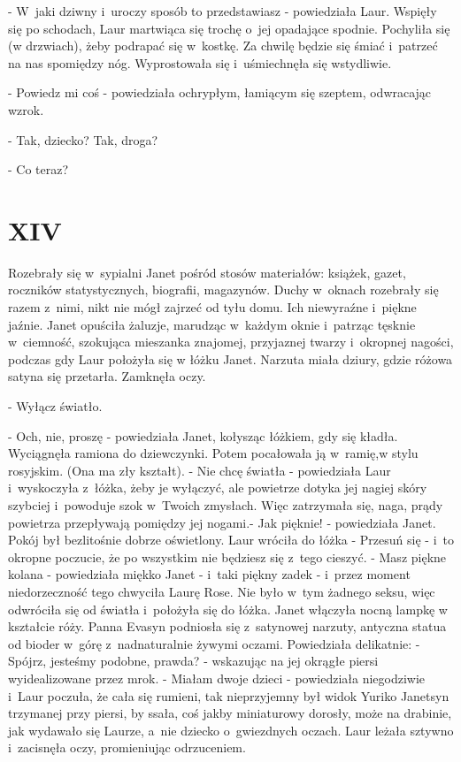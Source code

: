 \documentclass[oneside,polish,12pt,sfheadings]{mwbk}
\begin{document}
- W~jaki dziwny i~uroczy sposób to przedstawiasz - powiedziała Laur.
Wspięły się po schodach, Laur martwiąca się trochę o~jej opadające
spodnie. Pochyliła się (w drzwiach), żeby podrapać się w~kostkę. Za
chwilę będzie się śmiać i~patrzeć na nas spomiędzy nóg. Wyprostowała
się i~uśmiechnęła się wstydliwie.

- Powiedz mi coś - powiedziała ochrypłym, łamiącym się szeptem, odwracając
wzrok.

- Tak, dziecko? Tak, droga?

- Co teraz?

\chapter{XIV}

Rozebrały się w~sypialni Janet pośród stosów materiałów: książek,
gazet, roczników statystycznych, biografii, magazynów. Duchy w~oknach
rozebrały się razem z~nimi, nikt nie mógł zajrzeć od tyłu domu. Ich
niewyraźne i~piękne jaźnie. Janet opuściła żaluzje, marudząc w~każdym
oknie i~patrząc tęsknie w~ciemność, szokująca mieszanka znajomej,
przyjaznej twarzy i~okropnej nagości, podczas gdy Laur położyła się
w łóżku Janet. Narzuta miała dziury, gdzie różowa satyna się przetarła.
Zamknęła oczy.

- Wyłącz światło.

- Och, nie, proszę - powiedziała Janet, kołysząc łóżkiem, gdy się
kładła. Wyciągnęła ramiona do dziewczynki. Potem pocałowała ją w~ramię,w
stylu rosyjskim. (Ona ma zły kształt). - Nie chcę światła - powiedziała
Laur i~wyskoczyła z~łóżka, żeby je wyłączyć, ale powietrze dotyka
jej nagiej skóry szybciej i~powoduje szok w~Twoich zmysłach. Więc
zatrzymała się, naga, prądy powietrza przepływają pomiędzy jej nogami.- Jak pięknie! - powiedziała Janet. Pokój był bezlitośnie dobrze oświetlony.
Laur wróciła do łóżka - Przesuń się - i~to okropne poczucie, że po
wszystkim nie będziesz się z~tego cieszyć. - Masz piękne kolana -
powiedziała miękko Janet - i~taki piękny zadek - i~przez moment niedorzeczność
tego chwyciła Laurę Rose. Nie było w~tym żadnego seksu, więc odwróciła
się od światła i~położyła się do łóżka. Janet włączyła nocną lampkę
w kształcie róży. Panna Evasyn podniosła się z~satynowej narzuty,
antyczna statua od bioder w~górę z~nadnaturalnie żywymi oczami. Powiedziała
delikatnie: - Spójrz, jesteśmy podobne, prawda? - wskazując na jej
okrągłe piersi wyidealizowane przez mrok. - Miałam dwoje dzieci -
powiedziała niegodziwie i~Laur poczuła, że cała się rumieni, tak nieprzyjemny
był widok Yuriko Janetsyn trzymanej przy piersi, by ssała, coś jakby
miniaturowy dorosły, może na drabinie, jak wydawało się Laurze, a~nie dziecko o~gwiezdnych oczach. Laur leżała sztywno i~zacisnęła oczy,
promieniując odrzuceniem.
\end{document}
